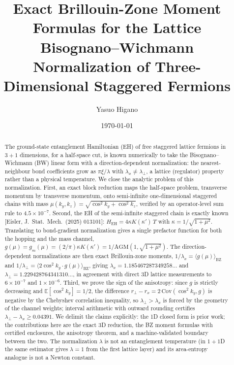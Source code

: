 \documentclass[aps,prb,preprint,nofootinbib]{revtex4-2}
\begin{document}
\title{Exact Brillouin-Zone Moment Formulas for the Lattice Bisognano--Wichmann\\
Normalization of Three-Dimensional Staggered Fermions}

\author{Yasuo Higano}

\date{\today}

\begin{abstract}
The ground-state entanglement Hamiltonian (EH) of free staggered lattice
fermions in $3+1$ dimensions, for a half-space cut, is known numerically to
take the Bisognano--Wichmann (BW) linear form with a direction-dependent
normalization: the nearest-neighbour bond coefficients grow as $\pi\xi/\lambda$
with $\lambda_x \neq \lambda_\perp$, a lattice (regulator) property rather than
a physical temperature. We close the analytic problem of this normalization.
First, an exact block reduction maps the half-space problem, transverse
momentum by transverse momentum, onto semi-infinite one-dimensional staggered
chains with mass $\mu(k_y,k_z) = \sqrt{\cos^2 k_y + \cos^2 k_z}$, verified by
an operator-level sum rule to $4.5\times 10^{-7}$. Second, the EH of the
semi-infinite staggered chain is exactly known [Eisler, J.~Stat.~Mech.\ (2025)
013101]: $H_{\mathrm{EH}} = 4\kappa K(\kappa')\,T$ with
$\kappa = 1/\sqrt{1+\mu^2}$. Translating to bond-gradient normalization gives a
single prefactor function for both the hopping and the mass channel,
$g(\mu) = g_m(\mu) = (2/\pi)\kappa K(\kappa') = 1/\mathrm{AGM}(1,\sqrt{1+\mu^2})$.
The direction-dependent normalizations are then exact Brillouin-zone moments,
$1/\lambda_x = \langle g(\mu)\rangle_{\mathrm{BZ}}$ and
$1/\lambda_\perp = \langle 2\cos^2 k_y \cdot g(\mu)\rangle_{\mathrm{BZ}}$,
giving $\lambda_x = 1.185467287349258\ldots$ and
$\lambda_\perp = 1.229428764341310\ldots$, in agreement with direct 3D lattice
measurements to $6\times 10^{-7}$ and $1\times 10^{-6}$. Third, we prove the
sign of the anisotropy: since $g$ is strictly decreasing and
$\mathbb{E}[\cos^2 k_y] = 1/2$, the difference
$r_\perp - r_x = 2\,\mathrm{Cov}(\cos^2 k_y, g)$ is negative by the Chebyshev
correlation inequality, so $\lambda_\perp > \lambda_x$ is forced by the
geometry of the channel weights; interval arithmetic with outward rounding
certifies $\lambda_\perp - \lambda_x \ge 0.04391$. We delimit the claims
explicitly: the 1D closed form is prior work; the contributions here are the
exact 3D reduction, the BZ moment formulas with certified enclosures, the
anisotropy theorem, and a machine-validated boundary between the two. The
normalization $\lambda$ is not an entanglement temperature (in $1+1$D the same
estimator gives $\lambda = 1$ from the first lattice layer) and its
area-entropy analogue is not a Newton constant.
\end{abstract}
\end{document}
